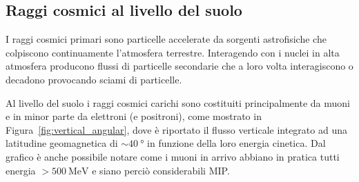 \subsection{Raggi cosmici al livello del suolo}  %

I raggi cosmici primari sono particelle accelerate da sorgenti astrofisiche che colpiscono continuamente l'atmosfera terrestre. Interagendo con i nuclei in alta atmosfera producono flussi di particelle secondarie che a loro volta interagiscono o decadono provocando sciami di particelle.

Al livello del suolo i raggi cosmici carichi sono costituiti principalmente da muoni
e in minor parte da elettroni (e positroni),
come mostrato in Figura~\ref{fig:vertical_angular},
dove è riportato il flusso verticale integrato ad una latitudine geomagnetica di $\sim \SI{40}{\degree}$ in funzione della loro energia cinetica. Dal grafico è anche possibile notare come i muoni in arrivo abbiano in pratica tutti energia $>\SI{500}{\MeV}$ e siano perciò considerabili MIP.

